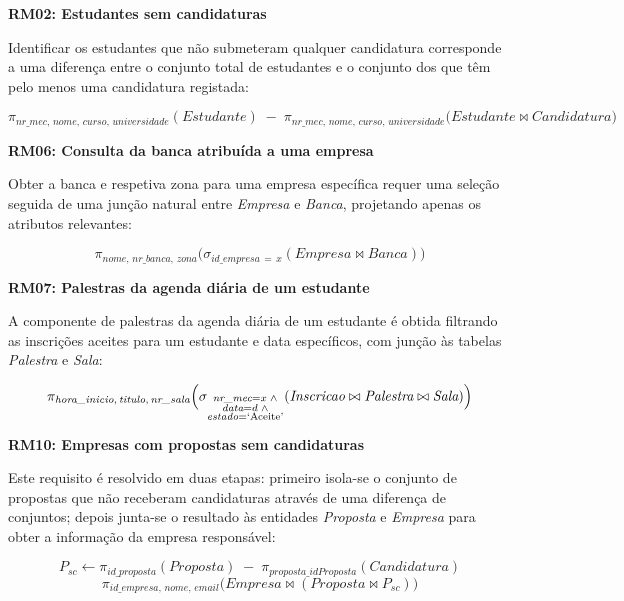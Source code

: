 \documentclass[12pt,a4paper]{article}
\begin{document}
\medskip
\noindent\textbf{RM02: Estudantes sem candidaturas}

\noindent Identificar os estudantes que não submeteram qualquer candidatura
corresponde a uma diferença entre o conjunto total de estudantes e o conjunto
dos que têm pelo menos uma candidatura registada:

\[
\pi_{\textit{nr\_mec},\, \textit{nome},\, \textit{curso},\, \textit{universidade}}(\textit{Estudante})
\;-\;
\pi_{\textit{nr\_mec},\, \textit{nome},\, \textit{curso},\, \textit{universidade}}
\bigl(\textit{Estudante} \bowtie \textit{Candidatura}\bigr)
\]

\medskip
\noindent\textbf{RM06: Consulta da banca atribuída a uma empresa}

\noindent Obter a banca e respetiva zona para uma empresa específica requer uma
seleção seguida de uma junção natural entre \textit{Empresa} e \textit{Banca},
projetando apenas os atributos relevantes:

\[
\pi_{\textit{nome},\, \textit{nr\_banca},\, \textit{zona}}
\bigl(\sigma_{\textit{id\_empresa}\,=\,x}(\textit{Empresa} \bowtie \textit{Banca})\bigr)
\]

\medskip
\noindent\textbf{RM07: Palestras da agenda diária de um estudante}

\noindent A componente de palestras da agenda diária de um estudante é obtida
filtrando as inscrições aceites para um estudante e data específicos, com junção
às tabelas \textit{Palestra} e \textit{Sala}:

\[
\pi_{\textit{hora\_inicio},\, \textit{titulo},\, \textit{nr\_sala}}
\Bigl(
  \sigma_{\substack{\textit{nr\_mec}=x \;\land\\ \textit{data}=d \;\land\\ \textit{estado}=\text{`Aceite'}}}
  (\textit{Inscricao} \bowtie \textit{Palestra} \bowtie \textit{Sala})
\Bigr)
\]

\medskip
\noindent\textbf{RM10: Empresas com propostas sem candidaturas}

\noindent Este requisito é resolvido em duas etapas: primeiro isola-se o
conjunto de propostas que não receberam candidaturas através de uma diferença
de conjuntos; depois junta-se o resultado às entidades \textit{Proposta} e
\textit{Empresa} para obter a informação da empresa responsável:

\[
P_{sc} \leftarrow \pi_{\textit{id\_proposta}}(\textit{Proposta})
\;-\;
\pi_{\textit{proposta\_idProposta}}(\textit{Candidatura})
\]
\[
\pi_{\textit{id\_empresa},\, \textit{nome},\, \textit{email}}
\bigl(\textit{Empresa} \bowtie (\textit{Proposta} \bowtie P_{sc})\bigr)
\]
\end{document}
